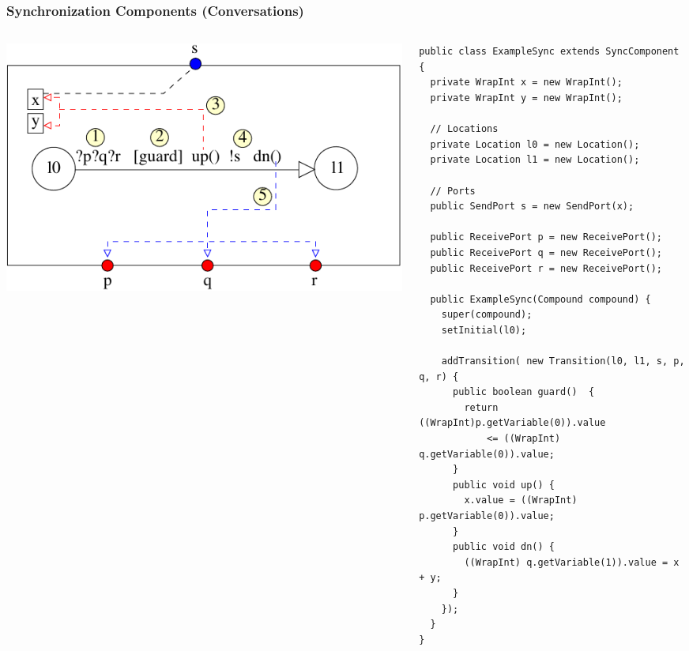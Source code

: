\documentclass[compress,xcolor=dvipsnames,10pt]{beamer}
\begin{document}
\begin{frame}[fragile]
\frametitle{Synchronization Components (Conversations)}
\begin{columns}
 \begin{column}{0.45\linewidth}
  \begin{center}
 \includegraphics[scale=0.5]{figs/synccomponent.pdf}
\end{center}
  \end{column}
   \begin{column}{0.55\linewidth}
   \begin{lstlisting}[style=customjava, basicstyle=\ttfamily\tiny]
public class ExampleSync extends SyncComponent {
  private WrapInt x = new WrapInt();
  private WrapInt y = new WrapInt();
  
  // Locations
  private Location l0 = new Location();
  private Location l1 = new Location();
   
  // Ports
  public SendPort s = new SendPort(x);
  
  public ReceivePort p = new ReceivePort();
  public ReceivePort q = new ReceivePort();
  public ReceivePort r = new ReceivePort();

  public ExampleSync(Compound compound) {
    super(compound);
    setInitial(l0);
    
    addTransition( new Transition(l0, l1, s, p, q, r) {
      public boolean guard()  { 
        return ((WrapInt)p.getVariable(0)).value 
            <= ((WrapInt) q.getVariable(0)).value;
      }
      public void up() { 
        x.value = ((WrapInt) p.getVariable(0)).value; 
      }
      public void dn() { 
        ((WrapInt) q.getVariable(1)).value = x + y; 
      }
    });
  }
}
\end{lstlisting}
  \end{column}
 \end{columns}
\end{frame}
\end{document}
